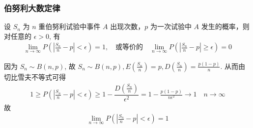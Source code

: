 \documentclass[Prob-All.tex]{subfiles}
\begin{document}
\begin{frame}
	\frametitle{伯努利大数定律}
	\begin{thm}
		设 $S_n$ 为 $n$ 重伯努利试验中事件 $A$ 出现次数，$p$ 为一次试验中 $A$ 发生的概率，则对任意的 $\epsilon>0$, 有
		\begin{eqnarray*}
			\lim_{n\rightarrow\infty} P (|\frac{S_n}{n}-p|<\epsilon)=1, \quad\mbox{或等价的}\quad \lim_{n\rightarrow\infty} P (|\frac{S_n}{n}-p|\ge\epsilon)=0
		\end{eqnarray*}
	\end{thm}
	\pause \zheng 因为 $S_n\sim B (n,p)$, 故 $S_n\sim B (n,p), E (\frac{S_n}{n})=p, D (\frac{S_n}{n})=\frac{p (1-p)}{n}$. \pause 从而由切比雪夫不等式可得
	\begin{eqnarray*}
		1\ge P(|\frac{S_n}{n}-p|<\epsilon)\ge 1-\dfrac{D(\frac{S_n}{n})}{\epsilon^2}=1-\frac{p(1-p)}{n\epsilon^2}\rightarrow 1  \quad n\rightarrow \infty
	\end{eqnarray*}
	\pause 故
	\begin{eqnarray*}
		\lim_{n\rightarrow\infty}P(|\frac{S_n}{n}-p|<\epsilon)=1
	\end{eqnarray*}
\end{frame}
\end{document}
